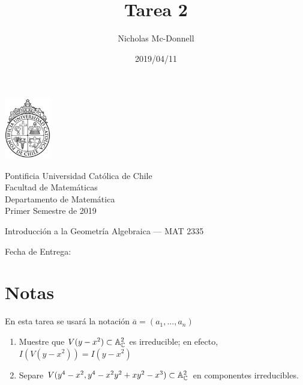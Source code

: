 

\title{Tarea 2}
\author{Nicholas Mc-Donnell}
\date{2019/04/11}



\begin{minipage}{2.5cm}
    \includegraphics[width=2cm]{../../figures/logo1.jpg}
\end{minipage}
\begin{minipage}{13cm}
    \begin{flushleft}
        \raggedright{
            \noindent
            {\sc Pontificia Universidad Católica de Chile\\
                Facultad de Matemáticas\\
                Departamento de Matemática} \smallskip \\
            Primer Semestre de 2019\\
        }
    \end{flushleft}
\end{minipage}

\vspace{2ex}
{\Large \centerline{\bf \thetitle}}
{\large \centerline{Introducción a la Geometría Algebraica --- MAT 2335}}
{\normalsize \centerline{ Fecha de Entrega: \thedate}}
\vfill

\begin{flushright}
    {\large\theauthor}
\end{flushright}
\newpage
\normalsize
{}
\tableofcontents
\newpage

\section*{Notas}
En esta tarea se usará la notación \(\overline{a}=(a_1,...,a_n)\)\\

\begin{prob}{1.25}
    \begin{enumerate}
        \item Muestre que \(V(y-x^2)\subset\mathbb{A}_{\mathbb{C}}^2\) es irreducible; en efecto, \(I(V(y-x^2))=I(y-x^2)\)
        \item Separe \(V(y^4-x^2,y^4-x^2y^2+xy^2-x^3)\subset\mathbb{A}_{\mathbb{C}}^2\) en componentes irreducibles.
    \end{enumerate}
\end{prob}

